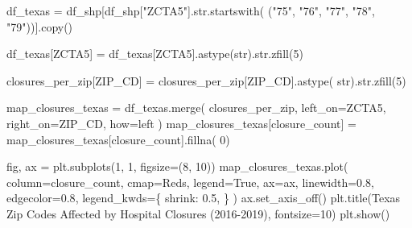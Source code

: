 \documentclass[
  letterpaper,
  DIV=11,
  numbers=noendperiod]{scrartcl}
\newenvironment{Shaded}{\begin{snugshade}}{\end{snugshade}}
\newcommand{\BuiltInTok}[1]{\textcolor[rgb]{0.00,0.23,0.31}{#1}}
\newcommand{\DecValTok}[1]{\textcolor[rgb]{0.68,0.00,0.00}{#1}}
\newcommand{\FloatTok}[1]{\textcolor[rgb]{0.68,0.00,0.00}{#1}}
\newcommand{\NormalTok}[1]{\textcolor[rgb]{0.00,0.23,0.31}{#1}}
\newcommand{\OperatorTok}[1]{\textcolor[rgb]{0.37,0.37,0.37}{#1}}
\newcommand{\StringTok}[1]{\textcolor[rgb]{0.13,0.47,0.30}{#1}}
\newcommand{\VariableTok}[1]{\textcolor[rgb]{0.07,0.07,0.07}{#1}}
\begin{document}
\begin{Shaded}
\begin{Highlighting}[]
\NormalTok{df\_texas }\OperatorTok{=}\NormalTok{ df\_shp[df\_shp[}\StringTok{"ZCTA5"}\NormalTok{].}\BuiltInTok{str}\NormalTok{.startswith(}
\NormalTok{    (}\StringTok{"75"}\NormalTok{, }\StringTok{"76"}\NormalTok{, }\StringTok{"77"}\NormalTok{, }\StringTok{"78"}\NormalTok{, }\StringTok{"79"}\NormalTok{))].copy()}

\NormalTok{df\_texas[}\StringTok{\textquotesingle{}ZCTA5\textquotesingle{}}\NormalTok{] }\OperatorTok{=}\NormalTok{ df\_texas[}\StringTok{\textquotesingle{}ZCTA5\textquotesingle{}}\NormalTok{].astype(}\BuiltInTok{str}\NormalTok{).}\BuiltInTok{str}\NormalTok{.zfill(}\DecValTok{5}\NormalTok{)}

\NormalTok{closures\_per\_zip[}\StringTok{\textquotesingle{}ZIP\_CD\textquotesingle{}}\NormalTok{] }\OperatorTok{=}\NormalTok{ closures\_per\_zip[}\StringTok{\textquotesingle{}ZIP\_CD\textquotesingle{}}\NormalTok{].astype(}
    \BuiltInTok{str}\NormalTok{).}\BuiltInTok{str}\NormalTok{.zfill(}\DecValTok{5}\NormalTok{)}

\NormalTok{map\_closures\_texas }\OperatorTok{=}\NormalTok{ df\_texas.merge(}
\NormalTok{    closures\_per\_zip, left\_on}\OperatorTok{=}\StringTok{\textquotesingle{}ZCTA5\textquotesingle{}}\NormalTok{, right\_on}\OperatorTok{=}\StringTok{\textquotesingle{}ZIP\_CD\textquotesingle{}}\NormalTok{, how}\OperatorTok{=}\StringTok{\textquotesingle{}left\textquotesingle{}}
\NormalTok{)}
\NormalTok{map\_closures\_texas[}\StringTok{\textquotesingle{}closure\_count\textquotesingle{}}\NormalTok{] }\OperatorTok{=}\NormalTok{ map\_closures\_texas[}\StringTok{\textquotesingle{}closure\_count\textquotesingle{}}\NormalTok{].fillna(}
    \DecValTok{0}\NormalTok{)}

\NormalTok{fig, ax }\OperatorTok{=}\NormalTok{ plt.subplots(}\DecValTok{1}\NormalTok{, }\DecValTok{1}\NormalTok{, figsize}\OperatorTok{=}\NormalTok{(}\DecValTok{8}\NormalTok{, }\DecValTok{10}\NormalTok{))}
\NormalTok{map\_closures\_texas.plot(}
\NormalTok{    column}\OperatorTok{=}\StringTok{\textquotesingle{}closure\_count\textquotesingle{}}\NormalTok{,}
\NormalTok{    cmap}\OperatorTok{=}\StringTok{\textquotesingle{}Reds\textquotesingle{}}\NormalTok{,}
\NormalTok{    legend}\OperatorTok{=}\VariableTok{True}\NormalTok{,}
\NormalTok{    ax}\OperatorTok{=}\NormalTok{ax,}
\NormalTok{    linewidth}\OperatorTok{=}\FloatTok{0.8}\NormalTok{,}
\NormalTok{    edgecolor}\OperatorTok{=}\StringTok{\textquotesingle{}0.8\textquotesingle{}}\NormalTok{,}
\NormalTok{    legend\_kwds}\OperatorTok{=}\NormalTok{\{}
        \StringTok{\textquotesingle{}shrink\textquotesingle{}}\NormalTok{: }\FloatTok{0.5}\NormalTok{, }
\NormalTok{    \}}
\NormalTok{)}
\NormalTok{ax.set\_axis\_off()}
\NormalTok{plt.title(}\StringTok{\textquotesingle{}Texas Zip Codes Affected by Hospital Closures (2016{-}2019)\textquotesingle{}}\NormalTok{, fontsize}\OperatorTok{=}\DecValTok{10}\NormalTok{)}
\NormalTok{plt.show()}



\end{Highlighting}
\end{Shaded}
\end{document}
